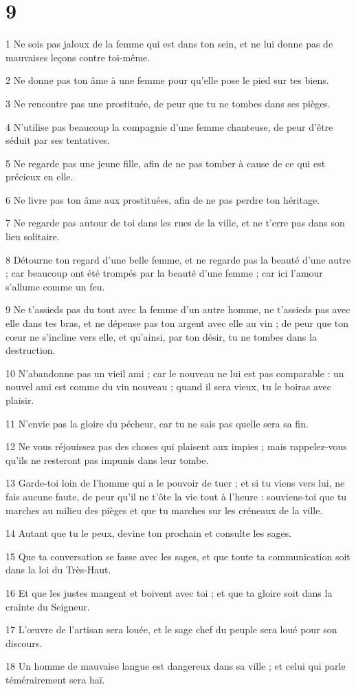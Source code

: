 \chapter{9}

\par 1 Ne sois pas jaloux de la femme qui est dans ton sein, et ne lui donne pas de mauvaises leçons contre toi-même.
\par 2 Ne donne pas ton âme à une femme pour qu'elle pose le pied sur tes biens.
\par 3 Ne rencontre pas une prostituée, de peur que tu ne tombes dans ses pièges.
\par 4 N'utilise pas beaucoup la compagnie d'une femme chanteuse, de peur d'être séduit par ses tentatives.
\par 5 Ne regarde pas une jeune fille, afin de ne pas tomber à cause de ce qui est précieux en elle.
\par 6 Ne livre pas ton âme aux prostituées, afin de ne pas perdre ton héritage.
\par 7 Ne regarde pas autour de toi dans les rues de la ville, et ne t'erre pas dans son lieu solitaire.
\par 8 Détourne ton regard d'une belle femme, et ne regarde pas la beauté d'une autre ; car beaucoup ont été trompés par la beauté d’une femme ; car ici l'amour s'allume comme un feu.
\par 9 Ne t'assieds pas du tout avec la femme d'un autre homme, ne t'assieds pas avec elle dans tes bras, et ne dépense pas ton argent avec elle au vin ; de peur que ton cœur ne s'incline vers elle, et qu'ainsi, par ton désir, tu ne tombes dans la destruction.
\par 10 N'abandonne pas un vieil ami ; car le nouveau ne lui est pas comparable : un nouvel ami est comme du vin nouveau ; quand il sera vieux, tu le boiras avec plaisir.
\par 11 N'envie pas la gloire du pécheur, car tu ne sais pas quelle sera sa fin.
\par 12 Ne vous réjouissez pas des choses qui plaisent aux impies ; mais rappelez-vous qu'ils ne resteront pas impunis dans leur tombe.
\par 13 Garde-toi loin de l'homme qui a le pouvoir de tuer ; et si tu viens vers lui, ne fais aucune faute, de peur qu'il ne t'ôte la vie tout à l'heure : souviens-toi que tu marches au milieu des pièges et que tu marches sur les créneaux de la ville.
\par 14 Autant que tu le peux, devine ton prochain et consulte les sages.
\par 15 Que ta conversation se fasse avec les sages, et que toute ta communication soit dans la loi du Très-Haut.
\par 16 Et que les justes mangent et boivent avec toi ; et que ta gloire soit dans la crainte du Seigneur.
\par 17 L'œuvre de l'artisan sera louée, et le sage chef du peuple sera loué pour son discours.
\par 18 Un homme de mauvaise langue est dangereux dans sa ville ; et celui qui parle témérairement sera haï.

